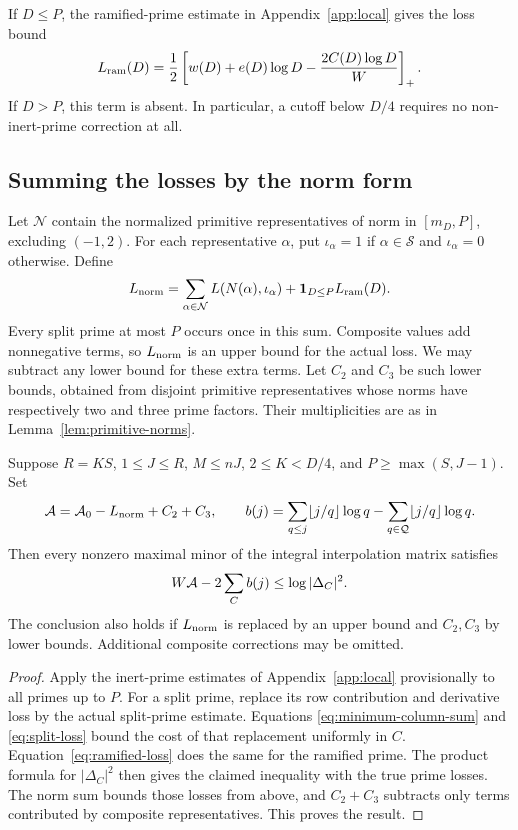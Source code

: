 If $D\leq P$, the ramified-prime estimate in Appendix~\ref{app:local}
gives the loss bound
\begin{equation}\label{eq:ramified-loss}
 L_{\rm ram}(D)=\frac12
 \left[w(D)+e(D)\log D-\frac{2C(D)\log D}{W}\right]_+.
\end{equation}
If $D>P$, this term is absent. In particular, a cutoff below $D/4$
requires no non-inert-prime correction at all.

\subsection{Summing the losses by the norm form}
Let $\mathcal N$ contain the normalized primitive representatives of
norm in $[m_D,P]$, excluding $(-1,2)$. For each representative $\alpha$,
put $\iota_\alpha=1$ if $\alpha\in\mathcal S$ and $\iota_\alpha=0$
otherwise. Define
\[
 L_{\rm norm}=\sum_{\alpha\in\mathcal N}L(N(\alpha),\iota_\alpha)
             +\boldsymbol1_{D\leq P}L_{\rm ram}(D).
\]
Every split prime at most $P$ occurs once in this sum. Composite values
add nonnegative terms, so $L_{\rm norm}$ is an upper bound for the
actual loss. We may subtract any lower bound for these extra terms.
Let $C_2$ and $C_3$ be such lower bounds, obtained from disjoint primitive
representatives whose norms have respectively two and three prime factors.
Their multiplicities are as in Lemma~\ref{lem:primitive-norms}.

\begin{proposition}\label{prop:general-arithmetic}
Suppose $R=KS$, $1\leq J\leq R$, $M\leq nJ$,
$2\leq K<D/4$, and $P\geq\max(S,J-1)$. Set
\begin{equation}\label{eq:general-arithmetic-terms}
 \mathcal A=\mathcal A_0-L_{\rm norm}+C_2+C_3,\qquad
 b(j)=\sum_{q\leq j}\lfloor j/q\rfloor\log q
           -\sum_{q\in\mathcal Q}\lfloor j/q\rfloor\log q.
\end{equation}
Then every nonzero maximal minor of the integral interpolation matrix
satisfies
\[
 W\mathcal A-2\sum_C b(j)\leq\log|\Delta_C|^2.
\]
The conclusion also holds if $L_{\rm norm}$ is replaced by an upper bound
and $C_2,C_3$ by lower bounds. Additional composite corrections may be omitted.
\end{proposition}
\begin{proof}
Apply the inert-prime estimates of Appendix~\ref{app:local} provisionally
to all primes up to $P$. For a split prime, replace its row contribution
and derivative loss by the actual split-prime estimate. Equations
\eqref{eq:minimum-column-sum} and \eqref{eq:split-loss} bound the cost
of that replacement uniformly in $C$. Equation~\eqref{eq:ramified-loss}
does the same for the ramified prime. The product formula for
$|\Delta_C|^2$ then gives the claimed inequality with the true prime losses.
The norm sum bounds those losses from above, and $C_2+C_3$ subtracts
only terms contributed by composite representatives. This proves the result.
\end{proof}

